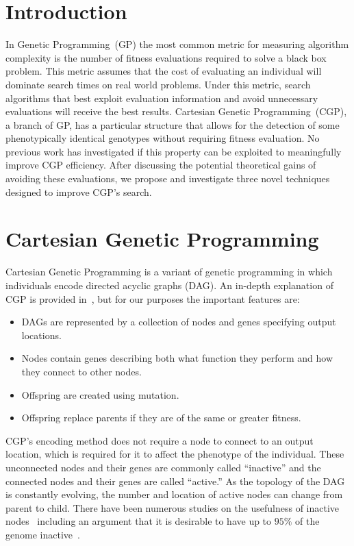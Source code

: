 \documentclass[runningheads,a4paper]{llncs}
\begin{document}
\section{Introduction}
In Genetic Programming~(GP) the most common metric for measuring algorithm complexity
is the number of fitness evaluations required to solve
a black box problem.  This metric assumes that the cost of evaluating an
individual will dominate search times on real world problems.  Under this
metric, search algorithms that best exploit evaluation information and avoid
unnecessary evaluations will receive the best results.  Cartesian Genetic
Programming~(CGP), a branch of GP, has a particular structure that allows
for the detection of some phenotypically identical genotypes without
requiring fitness evaluation.  No previous work has investigated if this
property can be exploited to meaningfully improve CGP efficiency.  After discussing the
potential theoretical gains of avoiding these evaluations, we propose and
investigate three novel techniques designed to improve CGP's
search.


\section{Cartesian Genetic Programming}
\label{sec:cgp}
Cartesian Genetic Programming is a variant of genetic programming in which
individuals encode directed acyclic graphs (DAG).
An in-depth explanation of CGP is provided in~\cite{miller:2011:chapter2}, but for
our purposes the important features are:
\begin{itemize}
  \item DAGs are represented by a collection of nodes and genes specifying output locations.
  \item Nodes contain genes describing both what function they perform
  and how they connect to other nodes.
  \item Offspring are created using mutation.
  \item Offspring replace parents if they are of the same or greater fitness.
\end{itemize}
CGP's encoding method does not require a node
to connect to an output location, which is required for it to
affect the phenotype of the individual.
These unconnected nodes and their genes are commonly called ``inactive''
and the connected nodes and their genes are called ``active.''
As the topology of the DAG is constantly evolving, the number and location of
active nodes can change from parent to child.
There have been numerous studies on the usefulness of inactive nodes~\cite{vassilev2000neutrality,yu:2001:neutrality}
including an argument that it is desirable to have up
to $95\%$ of the genome inactive~\cite{miller:2006:redundancy}.
\end{document}
